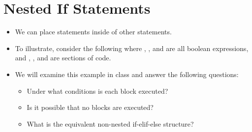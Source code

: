 \documentclass[letterpaper,10pt,english]{sphinxmanual}
\begin{document}
\section{Nested If Statements}
\label{\detokenize{lecture_notes/lec11_conditionals2:nested-if-statements}}\begin{itemize}
\item {} 
We can place  statements inside of other  statements.

\item {} 
To illustrate, consider the following where , ,
 and  are all boolean expressions, and ,
,  and  are sections of code.

%
\begin{sphinxVerbatim}[commandchars=\\\{\}]
 
     
     
 
\end{sphinxVerbatim}

\item {} 
We will examine this example in class and answer the following
questions:
\begin{itemize}
\item {} 
Under what conditions is each block executed?

\item {} 
Is it possible that no blocks are executed?

\item {} 
What is the equivalent non-nested if-elif-else structure?

\end{itemize}

\end{itemize}
\end{document}
